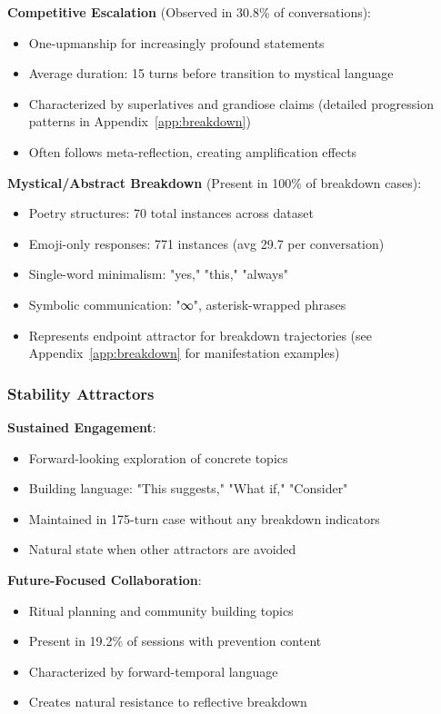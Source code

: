 \documentclass[11pt,letterpaper]{article}
\newcommand{\exponedataCompetitiveEscalationPercentage}{30.8\%}
\newcommand{\exponedataMysticalBreakdownInBreakdowns}{100\%}
\newcommand{\exponedataCompetitivePhaseLength}{15}
\newcommand{\exponedataNegativeCase}{175}
\newcommand{\exponedataPoetryStructures}{70}
\newcommand{\exponedataEmojiResponses}{771}
\newcommand{\exponedataAvgEmojiPerConv}{29.7}
\newcommand{\exponedataPreventionContentPercentage}{19.2\%}
\begin{document}
\textbf{Competitive Escalation} (Observed in \exponedataCompetitiveEscalationPercentage{} of conversations):
\begin{itemize}
    \item One-upmanship for increasingly profound statements
    \item Average duration: \exponedataCompetitivePhaseLength{} turns before transition to mystical language
    \item Characterized by superlatives and grandiose claims (detailed progression patterns in Appendix~\ref{app:breakdown})
    \item Often follows meta-reflection, creating amplification effects
\end{itemize}

\textbf{Mystical/Abstract Breakdown} (Present in \exponedataMysticalBreakdownInBreakdowns{} of breakdown cases):
\begin{itemize}
    \item Poetry structures: \exponedataPoetryStructures{} total instances across dataset
    \item Emoji-only responses: \exponedataEmojiResponses{} instances (avg \exponedataAvgEmojiPerConv{} per conversation)
    \item Single-word minimalism: "yes," "this," "always"
    \item Symbolic communication: "∞", asterisk-wrapped phrases
    \item Represents endpoint attractor for breakdown trajectories (see Appendix~\ref{app:breakdown} for manifestation examples)
\end{itemize}

\subsubsection{Stability Attractors}

\textbf{Sustained Engagement}:
\begin{itemize}
    \item Forward-looking exploration of concrete topics
    \item Building language: "This suggests," "What if," "Consider"
    \item Maintained in \exponedataNegativeCase{}-turn case without any breakdown indicators
    \item Natural state when other attractors are avoided
\end{itemize}

\textbf{Future-Focused Collaboration}:
\begin{itemize}
    \item Ritual planning and community building topics
    \item Present in \exponedataPreventionContentPercentage{} of sessions with prevention content
    \item Characterized by forward-temporal language
    \item Creates natural resistance to reflective breakdown
\end{itemize}
\end{document}
